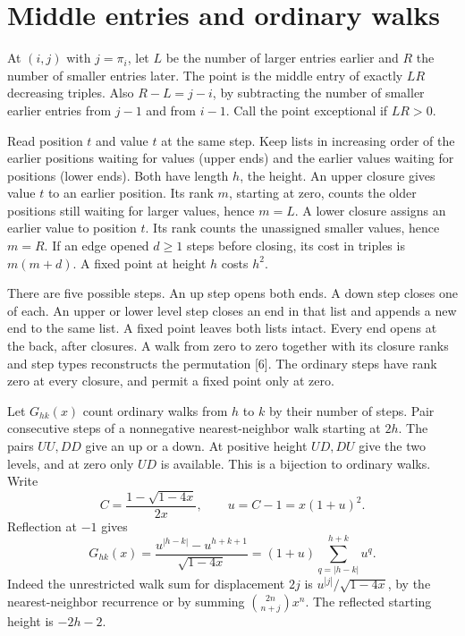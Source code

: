 \documentclass[11pt,letterpaper]{article}
\begin{document}
\section{Middle entries and ordinary walks}
At $(i,j)$ with $j=\pi_i$, let $L$ be the number of larger entries earlier and $R$ the number of smaller entries later. The point is the middle entry of exactly $LR$ decreasing triples. Also $R-L=j-i$, by subtracting the number of smaller earlier entries from $j-1$ and from $i-1$. Call the point exceptional if $LR>0$.

Read position $t$ and value $t$ at the same step. Keep lists in increasing order of the earlier positions waiting for values (upper ends) and the earlier values waiting for positions (lower ends). Both have length $h$, the height. An upper closure gives value $t$ to an earlier position. Its rank $m$, starting at zero, counts the older positions still waiting for larger values, hence $m=L$. A lower closure assigns an earlier value to position $t$. Its rank counts the unassigned smaller values, hence $m=R$. If an edge opened $d\ge1$ steps before closing, its cost in triples is $m(m+d)$. A fixed point at height $h$ costs $h^2$.

There are five possible steps. An up step opens both ends. A down step closes one of each. An upper or lower level step closes an end in that list and appends a new end to the same list. A fixed point leaves both lists intact. Every end opens at the back, after closures. A walk from zero to zero together with its closure ranks and step types reconstructs the permutation [6]. The ordinary steps have rank zero at every closure, and permit a fixed point only at zero.

Let $G_{hk}(x)$ count ordinary walks from $h$ to $k$ by their number of steps. Pair consecutive steps of a nonnegative nearest-neighbor walk starting at $2h$. The pairs $UU,DD$ give an up or a down. At positive height $UD,DU$ give the two levels, and at zero only $UD$ is available. This is a bijection to ordinary walks. Write
\[
 C=\frac{1-\sqrt{1-4x}}{2x},\qquad u=C-1=x(1+u)^2 .
\]
Reflection at $-1$ gives
\begin{equation}
 G_{hk}(x)=\frac{u^{|h-k|}-u^{h+k+1}}{\sqrt{1-4x}}
          =(1+u)\sum_{q=|h-k|}^{h+k}u^q. \label{green}
\end{equation}
Indeed the unrestricted walk sum for displacement $2j$ is $u^{|j|}/\sqrt{1-4x}$, by the nearest-neighbor recurrence or by summing $\binom{2n}{n+j}x^n$. The reflected starting height is $-2h-2$.
\end{document}
